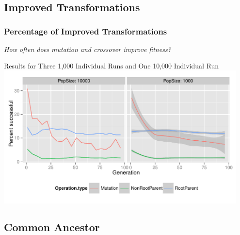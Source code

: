 \documentclass{beamer}
\begin{document}
\subsection[Improved Transformations]{Improved Transformations}

\begin{frame}
\frametitle{Percentage of Improved Transformations}
\emph{How often does mutation and crossover improve fitness?}
\begin{center}
{\tiny Results for Three 1,000 Individual Runs and One 10,000 Individual Run}
\includegraphics[width=0.95\textwidth]{All_percentages_over_time}
\end{center}
\end{frame}

\subsection[Common Ancestor]{Common Ancestor}
\end{document}
